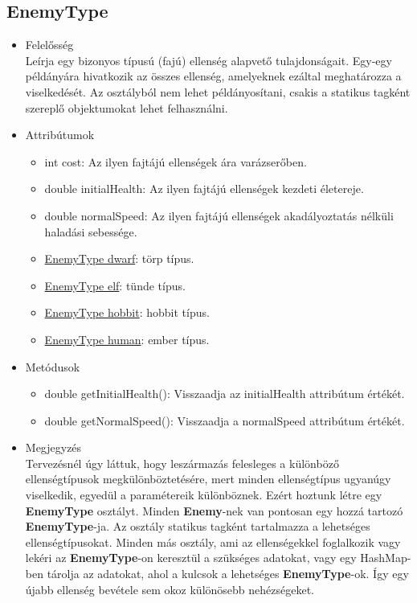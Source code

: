 \subsection{EnemyType}
\begin{itemize}
\item Felelősség\\
Leírja egy bizonyos típusú (fajú) ellenség alapvető tulajdonságait. Egy-egy példányára hivatkozik az összes ellenség, amelyeknek ezáltal meghatározza a viselkedését. Az osztályból nem lehet példányosítani, csakis a statikus tagként szereplő objektumokat lehet felhasználni.
\item Attribútumok
	\begin{itemize}
		\item int cost: Az ilyen fajtájú ellenségek ára varázserőben.
		\item double initialHealth: Az ilyen fajtájú ellenségek kezdeti életereje.
		\item double normalSpeed: Az ilyen fajtájú ellenségek akadályoztatás nélküli haladási sebessége.
		\item \underline{EnemyType dwarf}: törp típus.
		\item \underline{EnemyType elf}: tünde típus.
		\item \underline{EnemyType hobbit}: hobbit típus.
		\item \underline{EnemyType human}: ember típus.
	\end{itemize}
\item Metódusok
	\begin{itemize}
		\item double getInitialHealth(): Visszaadja az initialHealth attribútum értékét.
		\item double getNormalSpeed(): Visszaadja a normalSpeed attribútum értékét.
	\end{itemize}
\item Megjegyzés \\
Tervezésnél úgy láttuk, hogy leszármazás felesleges a különböző ellenségtípusok megkülönböztetésére, mert minden ellenségtípus ugyanúgy viselkedik, egyedül a paramétereik különböznek. Ezért hoztunk létre egy \textbf{EnemyType} osztályt. Minden \textbf{Enemy}-nek van pontosan egy hozzá tartozó\textbf{ EnemyType}-ja. Az osztály statikus tagként tartalmazza a lehetséges ellenségtípusokat. Minden más osztály, ami az ellenségekkel foglalkozik vagy lekéri az \textbf{EnemyType}-on keresztül a szükséges adatokat, vagy egy HashMap-ben tárolja az adatokat, ahol a kulcsok a lehetséges \textbf{EnemyType}-ok. Így egy újabb ellenség bevétele sem okoz különösebb nehézségeket.
\end{itemize}





